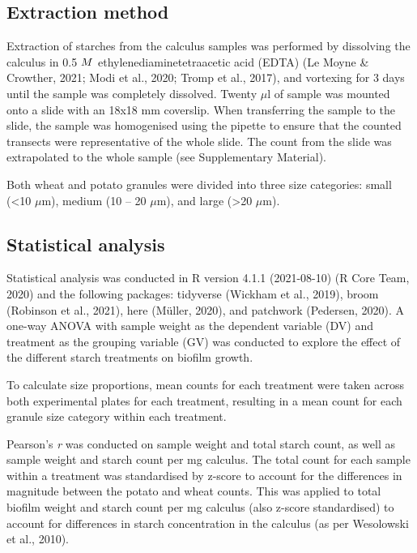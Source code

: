 \documentclass[
]{article}
\begin{document}
\hypertarget{extraction-method}{%
\subsection{Extraction method}\label{extraction-method}}

Extraction of starches from the calculus samples was performed by dissolving the
calculus in 0.5 \(\tiny{M}\) ethylenediaminetetraacetic acid (EDTA)
(Le Moyne \& Crowther, 2021; Modi et al., 2020; Tromp et al., 2017),
and vortexing for 3 days until the sample was completely dissolved.
Twenty \(\mu\)l of sample was mounted onto a slide with an 18x18 mm coverslip.
When transferring the sample to the slide, the sample was homogenised using
the pipette to ensure that the counted transects were representative of the
whole slide. The count from the slide was extrapolated to the whole sample
(see Supplementary Material).

Both wheat and potato granules were divided into three size categories:
small (\textless10 \(\mu\)m), medium (10 -- 20 \(\mu\)m), and large (\textgreater20 \(\mu\)m).

\hypertarget{statistical-analysis}{%
\subsection{Statistical analysis}\label{statistical-analysis}}

Statistical analysis was conducted in R version 4.1.1 (2021-08-10) (R Core Team, 2020) and
the following packages: tidyverse (Wickham et al., 2019), broom (Robinson et al., 2021),
here (Müller, 2020), and patchwork (Pedersen, 2020).
A one-way ANOVA with sample weight as the dependent variable (DV) and treatment
as the grouping variable (GV) was conducted to explore the effect of the different
starch treatments on biofilm growth.

To calculate size proportions, mean counts for each treatment were taken across
both experimental plates for each treatment, resulting in a mean count for each
granule size category within each treatment.

Pearson's \emph{r} was conducted on sample weight and total starch count, as well as sample
weight and starch count per mg calculus. The total count for each sample within a
treatment was standardised by z-score to account for the differences in magnitude
between the potato and wheat counts.
This was applied to total biofilm weight and starch count per mg
calculus (also z-score standardised) to account for differences in starch
concentration in the calculus (as per Wesolowski et al., 2010).
\end{document}
